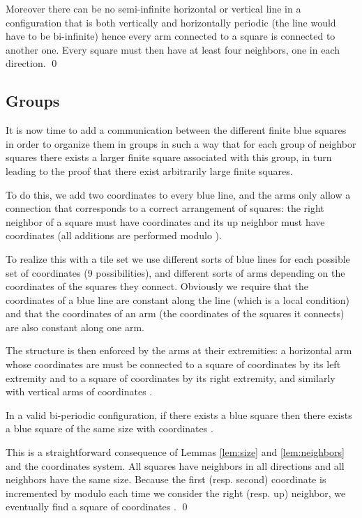 \documentclass{jac}
\begin{document}
Moreover there can be no semi-infinite horizontal or vertical line in a configuration that is both vertically and horizontally periodic (the line would have to be bi-infinite) hence every arm connected to a square is connected to another one. Every square must then have at least four neighbors, one in each direction.
\qed

\subsection{Groups} \label{sub:groups}
It is now time to add a communication between the different finite blue squares in order to organize them in groups in such a way that for each group of neighbor squares there exists a larger finite square associated with this group, in turn leading to the proof that there exist arbitrarily large finite squares.

To do this, we add two coordinates  to every blue line, and the arms only allow a connection that corresponds to a correct arrangement of squares: the right neighbor of a square  must have coordinates  and its up neighbor must have coordinates  (all additions are performed modulo ).

To realize this with a tile set we use different sorts of blue lines for each possible set of coordinates (9 possibilities), and different sorts of arms depending on the coordinates of the squares they connect. Obviously we require that the coordinates of a blue line are constant along the line (which is a local condition) and that the coordinates of an arm (the coordinates of the squares it connects) are also constant along one arm.

The structure is then enforced by the arms at their extremities: a horizontal arm whose coordinates are  must be connected to a square of coordinates  by its left extremity and to a square of coordinates  by its right extremity, and similarly with vertical arms of coordinates .

\begin{lemma}\label{lem:oneone}
In a valid bi-periodic configuration, if there exists a blue square then there exists a blue square of the same size with coordinates .
\end{lemma}
\proof This is a straightforward consequence of Lemmas \ref{lem:size} and \ref{lem:neighbors} and the coordinates system. All squares have neighbors in all directions and all neighbors have the same size. Because the first (resp. second) coordinate is incremented by  modulo  each time we consider the right (resp. up) neighbor, we eventually find a square of coordinates .
\qed
\end{document}
